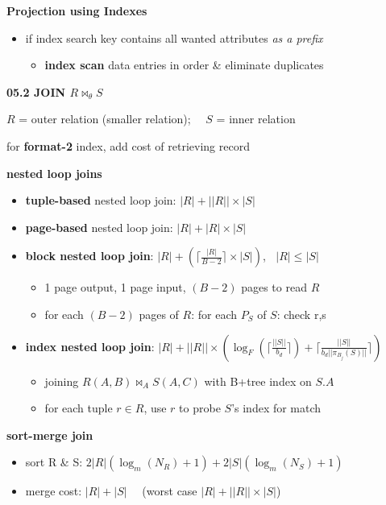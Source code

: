 \documentclass[8pt, landscape]{extarticle}
\begin{document}
\begin{multicols*}{4}
  \textbf{Projection using Indexes}

  \begin{itemize}
    \item if index search key contains all wanted attributes \textit{as a prefix}
      \begin{itemize}
        \item \textbf{index scan} data entries in order \& eliminate duplicates
      \end{itemize}
  \end{itemize}

  \textbf{05.2 JOIN $R \bowtie_\theta S$}

  $R$ = outer relation (smaller relation); $\quad S$ = inner relation

  \attention for \textbf{format-2} index, add cost of retrieving record

  \textbf{nested loop joins}

  \begin{itemize}
    \item \textbf{tuple-based} nested loop join: $|R| + ||R|| \times |S|$
    \item \textbf{page-based} nested loop join: $|R| + |R| \times |S|$
    \item \textbf{block nested loop join}: $|R| + ( \lceil \frac{|R|}{B-2} \rceil \times |S| )$, $\;\; |R|\leq|S|$
      \begin{itemize}
        \item 1 page output, 1 page input, $(B-2)$ pages to read $R$
        \item for each $(B-2)$ pages of $R$: for each $P_S$ of $S$: check r,s
      \end{itemize}
    \item \textbf{index nested loop join}: $|R| + ||R|| \times \left( \log_F(\lceil \frac{||S||}{b_d} \rceil ) + \lceil \frac{||S||}{b_d ||\pi_{B_j}(S)||} \rceil \right)$
      \begin{itemize}
        \item joining $R(A, B) \bowtie_A S(A,C)$ with B+tree index on $S.A$
        \item for each tuple $r \in R$, use $r$ to probe $S$'s index for match
      \end{itemize}
  \end{itemize}

  \textbf{sort-merge join}

  \begin{itemize}
    \item sort R \& S: $2|R| (\log_m(N_R)+1) + 2|S| (\log_m(N_S)+1)$
    \item merge cost: $|R| + |S| \quad$ (worst case $|R| + ||R||\times|S|$)
  \end{itemize}


\end{multicols*}
\end{document}
